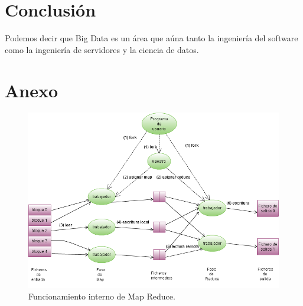 \documentclass[10pt]{article}
\begin{document}

\section{Conclusión} \label{sec:conclusion}

	Podemos decir que Big Data es un área que aúna tanto la ingeniería del software como la ingeniería de servidores y la ciencia de datos.


\printbibliography


\section*{Anexo}

	\begin{figure}[H]
		\centering
		\includegraphics[width=14cm]{./images/MapReduce-MasterWorkers.png}
		\caption{Funcionamiento interno de Map Reduce.} 
		\label{fig:map-reduce:master-workers}
	\end{figure}
\end{document}
